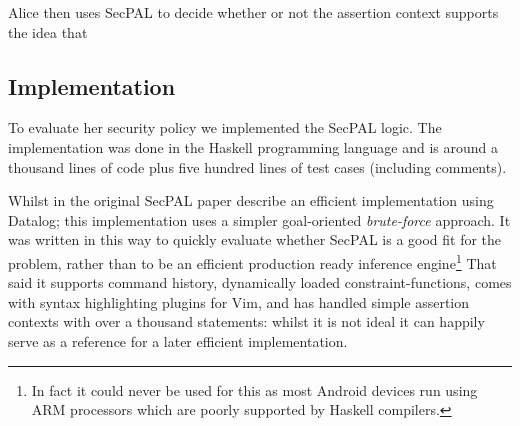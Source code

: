 \documentclass[report.tex]{subfiles}
\begin{document}
Alice then uses SecPAL to decide whether or not the assertion context supports
the idea that 

\subsection{Implementation}

To evaluate her security policy we implemented the SecPAL logic.
The implementation was done in the Haskell programming language and is around a
thousand lines of code plus five hundred lines of test cases (including
comments).

Whilst in the original SecPAL paper\cite{Becker:2010vh}
\citeauthor*{Becker:2010vh} describe an efficient implementation using Datalog;
this implementation uses a simpler goal-oriented \emph{brute-force} approach.
It was written in this way to quickly evaluate whether SecPAL is a good fit for
the problem, rather than to be an efficient production ready inference
engine\footnote{In fact it could never be used for this as most Android devices
  run using ARM processors which are poorly supported by Haskell compilers.}
That said it supports command history, dynamically loaded constraint-functions,
comes with syntax highlighting plugins for Vim, and has handled simple assertion
contexts with over a thousand statements: whilst it is not ideal it can happily serve as
a reference for a later efficient implementation.
\end{document}
